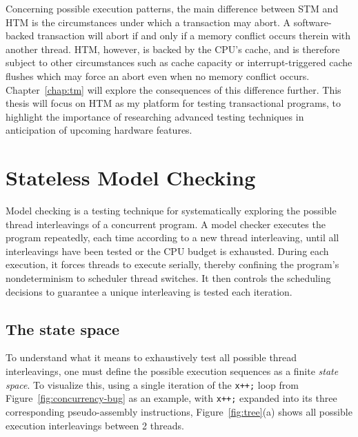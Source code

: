 Concerning possible execution patterns,
the main difference between STM and HTM is the circumstances under which a transaction may abort.
A software-backed transaction will abort if and only if a memory conflict occurs therein with another thread.
HTM, however, is backed by the CPU's cache, and is therefore subject to other circumstances such as cache capacity or interrupt-triggered cache flushes which may force an abort even when no memory conflict occurs.
Chapter~\ref{chap:tm} will explore the consequences of this difference further.
%
This thesis will focus on HTM as my platform for testing transactional programs,
to highlight the importance of researching advanced testing techniques in anticipation of upcoming hardware features.


\section{Stateless Model Checking}
\label{sec:overview-stateless} %

Model checking \cite{verisoft} is a testing technique for systematically exploring the possible thread interleavings of a concurrent program.
A model checker executes the program repeatedly, each time according to a new thread interleaving, until all interleavings have been tested or the CPU budget is exhausted.
During each execution, it forces threads to execute serially, thereby confining the program's nondeterminism to scheduler thread switches.
It then controls the scheduling decisions
to guarantee a unique interleaving is tested each iteration.

\subsection{The state space}

To understand what it means to exhaustively test all possible thread interleavings,
one must define the possible execution sequences as a finite {\em state space}.
To visualize this,
using a single iteration of the {\tt x++;} loop from Figure~\ref{fig:concurrency-bug} as an example,
with {\tt x++;} expanded into its three corresponding pseudo-assembly instructions,
Figure~\ref{fig:tree}(a) shows all possible execution interleavings
between 2 threads.

